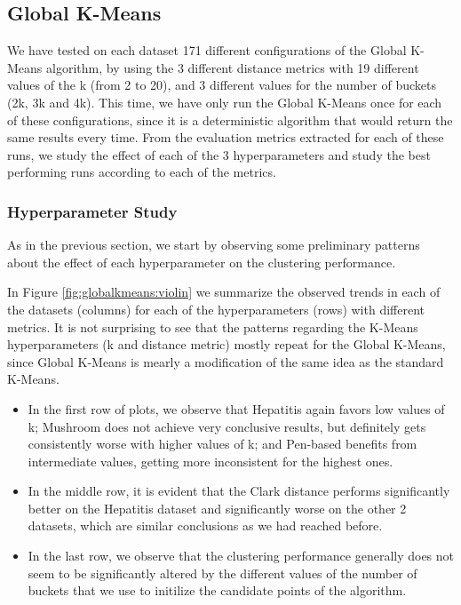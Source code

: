 \subsection{Global K-Means}
We have tested on each dataset 171 different configurations of the Global K-Means algorithm, by using the 3 different distance metrics with 19 different values of the k (from 2 to 20), and 3 different values for the number of buckets (2k, 3k and 4k). This time, we have only run the Global K-Means once for each of these configurations, since it is a deterministic algorithm that would return the same results every time. From the evaluation metrics extracted for each of these runs, we study the effect of each of the 3 hyperparameters and study the best performing runs according to each of the metrics.

\subsubsection{Hyperparameter Study}
As in the previous section, we start by observing some preliminary patterns about the effect of each hyperparameter on the clustering performance.

In Figure \ref{fig:globalkmeans:violin} we summarize the observed trends in each of the datasets (columns) for each of the hyperparameters (rows) with different metrics. It is not surprising to see that the patterns regarding the K-Means hyperparameters (k and distance metric) mostly repeat for the Global K-Means, since Global K-Means is mearly a modification of the same idea as the standard K-Means.

\begin{itemize}
    \item In the first row of plots, we observe that Hepatitis again favors low values of k; Mushroom does not achieve very conclusive results, but definitely gets consistently worse with higher values of k; and Pen-based benefits from intermediate values, getting more inconsistent for the highest ones.
    \item In the middle row, it is evident that the Clark distance performs significantly better on the Hepatitis dataset and significantly worse on the other 2 datasets, which are similar conclusions as we had reached before.
    \item In the last row, we observe that the clustering performance generally does not seem to be significantly altered by the different values of the number of buckets that we use to initilize the candidate points of the algorithm.
\end{itemize}



